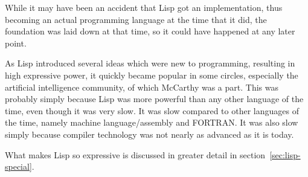 \documentclass[a4paper,10pt,twoside]{report}
\begin{document}
While it may have been an accident that Lisp got an implementation, thus
becoming an actual programming language at the time that it did, the foundation
was laid down at that time, so it could have happened at any later point.

As Lisp introduced several ideas which were new to programming, resulting in
high expressive power, it quickly became popular in some circles, especially the
artificial intelligence community, of which McCarthy was a part.  This was
probably simply because Lisp was more powerful than any other language of the
time, even though it was very slow.  It was slow compared to other languages of
the time, namely machine language/assembly and FORTRAN.  It was also slow simply
because compiler technology was not nearly as advanced as it is today.

What makes Lisp so expressive is discussed in greater detail in
section~\ref{sec:lisp-special}.
\end{document}
